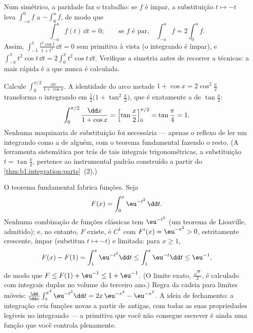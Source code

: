 \begin{example}\label{ex:b1:integration:parity}
Num  simétrico, a paridade faz o trabalho: se $f$ é ímpar,
a substituição $t \mapsto -t$ leva $\int_{-a}^{0} f$ a
$-\int_0^a f$, de modo que
\[
\int_{-a}^{a} f(t)\,\dd t = 0 ;
\qquad\text{se $f$ é par,}\quad
\int_{-a}^{a} f = 2\int_0^a f .
\]
Assim, $\int_{-1}^{1} \frac{t^3\cos t}{1 + t^4}\,\dd t = 0$ sem primitiva à vista
(o integrando é ímpar), e
$\int_{-\pi}^{\pi} t^2\cos t\,\dd t = 2\int_0^\pi t^2\cos t\,
\dd t$. Verifique a simetria antes de recorrer a técnicas: a
 mais rápida é a que nunca é calculada.
\end{example}

\begin{example}\label{ex:b1:integration:halfangle}
Calcule $\displaystyle\int_0^{\pi/2} \frac{\dd x}{1 + \cos x}$.
A identidade do arco metade $1 + \cos x = 2\cos^2\frac x2$ transforma o
integrando em $\frac{1}{2}\bigl(1 + \tan^2\frac
x2\bigr)$, que é exatamente a  de $\tan\frac x2$:
\[
\int_0^{\pi/2} \frac{\dd x}{1 + \cos x}
= \Bigl[\tan\frac x2\Bigr]_0^{\pi/2} = \tan\frac\pi4 = 1 .
\]
Nenhuma maquinaria de substituição foi necessária --- apenas o reflexo
de ler um integrando como a  de alguém, com o teorema
fundamental fazendo o resto. (A ferramenta sistemática por trás de tais
integrais trigonométricas, a substituição $t = \tan\frac x2$,
pertence ao instrumental padrão construído a partir do
\cref{thm:b1:integration:parts}~(2).)
\end{example}

\begin{example}\label{ex:b1:integration:definedby}
O teorema fundamental fabrica funções. Seja
\[
F(x) = \int_0^x \eu^{-t^2}\,\dd t .
\]
Nenhuma combinação de funções clássicas tem 
$\eu^{-t^2}$ (um teorema de Liouville, admitido); e, no entanto, $F$ existe,
é $C^1$ com $F'(x) = \eu^{-x^2} > 0$, estritamente crescente, ímpar
(substitua $t \mapsto -t$) e limitada: para $x \geq 1$,
\[
F(x) - F(1) = \int_1^x \eu^{-t^2}\dd t
\leq \int_1^x \eu^{-t}\dd t \leq \eu^{-1} ,
\]
de modo que $F \leq F(1) + \eu^{-1} \leq 1 + \eu^{-1}$. (O limite exato,
$\frac{\sqrt\pi}{2}$, é calculado com integrais duplas no
volume do terceiro ano.) Regra da cadeia para limites móveis: $\frac{\dd}{\dd
x}\int_x^{x^2} \eu^{-t^2}\dd t = 2x\,\eu^{-x^4} - \eu^{-x^2}$.
A ideia de fechamento: a integração \emph{cria} funções novas
a partir de antigas, com todas as suas propriedades legíveis no
integrando --- a primitiva que você não consegue escrever é ainda
uma função que você controla plenamente.
\end{example}

